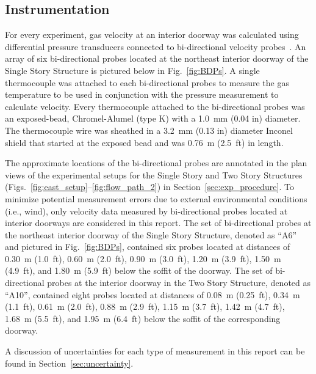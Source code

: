 \documentclass[12pt,oneside]{book}
\begin{document}
\subsection{Instrumentation}
\label{sec:instrumentation}
For every experiment, gas velocity at an interior doorway was calculated using differential pressure transducers connected to bi-directional velocity probes~\cite{McCaffrey:Combustion_and_Flame}. An array of six bi-directional probes located at the northeast interior doorway of the Single Story Structure is pictured below in Fig.~\ref{fig:BDPs}. A single thermocouple was attached to each bi-directional probes to measure the gas temperature to be used in conjunction with the pressure measurement to calculate velocity. Every thermocouple attached to the bi-directional probes was an exposed-bead, Chromel-Alumel (type K) with a 1.0~mm (0.04 in) diameter. The thermocouple wire was sheathed in a 3.2~mm (0.13 in) diameter Inconel shield that started at the exposed bead and was 0.76~m (2.5~ft) in length. 

The approximate locations of the bi-directional probes are annotated in the plan views of the experimental setups for the Single Story and Two Story Structures (Figs.~\ref{fig:east_setup}--\ref{fig:flow_path_2}) in Section~\ref{sec:exp_procedure}. To minimize potential measurement errors due to external environmental conditions (i.e., wind), only velocity data measured by bi-directional probes located at interior doorways are considered in this report. The set of bi-directional probes at the northeast interior doorway of the Single Story Structure, denoted as ``A6'' and pictured in Fig.~\ref{fig:BDPs}, contained six probes located at distances of 0.30~m (1.0~ft), 0.60~m (2.0~ft), 0.90~m (3.0~ft), 1.20~m (3.9~ft), 1.50~m (4.9~ft), and 1.80~m (5.9~ft) below the soffit of the doorway. The set of bi-directional probes at the interior doorway in the Two Story Structure, denoted as ``A10'', contained eight probes located at distances of 0.08~m (0.25~ft), 0.34~m (1.1~ft), 0.61~m (2.0~ft), 0.88~m (2.9~ft), 1.15~m (3.7~ft), 1.42~m (4.7~ft), 1.68~m (5.5~ft), and 1.95~m (6.4~ft) below the soffit of the corresponding doorway.

A discussion of uncertainties for each type of measurement in this report can be found in Section~\ref{sec:uncertainty}.
\end{document}
